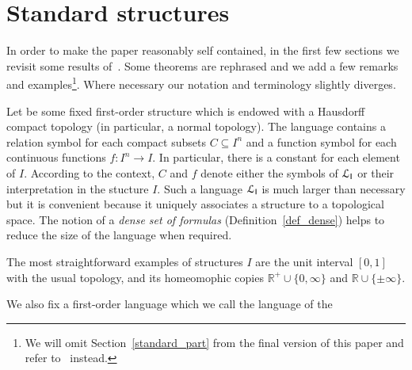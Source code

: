 \documentclass{amsproc}
\renewcommand*{\emph}[1]{%
   \smash{\tikz[baseline]\node[rectangle, fill=teal!25, rounded corners, inner xsep=0.5ex, inner ysep=0.2ex, anchor=base, minimum height = 2.7ex]{\strut #1};}}
\begin{document}
\section{Standard structures}\label{uno}


\def\ceq#1#2#3{\parbox[t]{23ex}{$\displaystyle #1$}\parbox{6ex}{\hfil $#2$}{$\displaystyle #3$}}

In order to make the paper reasonably self contained, in the first few sections we revisit some results of~\cite{clcl}.
Some theorems are rephrased and we add a few remarks and examples\footnote{We will omit Section~\ref{standard_part} from the final version of this paper and refer to~\cite{clcl} instead. 
}.
Where necessary our notation and terminology slightly diverges.

Let \emph{$I$\/} be some fixed first-order structure which is endowed with a Hausdorff compact topology (in particular, a normal topology).
The language \emph{${\EuScript L}_{\sf I}$\/} contains a relation symbol for each compact subsets $C\subseteq I^n$ and a function symbol for each continuous functions $f:I^n\to I$.
In particular, there is a constant for each element of $I$.
According to the context, $C$ and $f$ denote either the symbols of ${\EuScript L}_{\sf I}$ or their interpretation in the stucture $I$.
Such a language ${\EuScript L}_{\sf I}$ is much larger than necessary but it is convenient because it uniquely associates a structure to a topological space.
The notion of a \textit{dense set of formulas\/} (Definition~\ref{def_dense}) helps to reduce the size of the language when required.

The most straightforward examples of structures $I$ are the unit interval $[0,1]$ with the usual topology, and its homeomophic copies $\mathds{R}^+\cup\{0,\infty\}$ and $\mathds{R}\cup\{\pm\infty\}$.

We also fix a first-order language \emph{${\EuScript L}_{\sf H}$\/} which we call the language of the \emph{home sort.}
\end{document}
